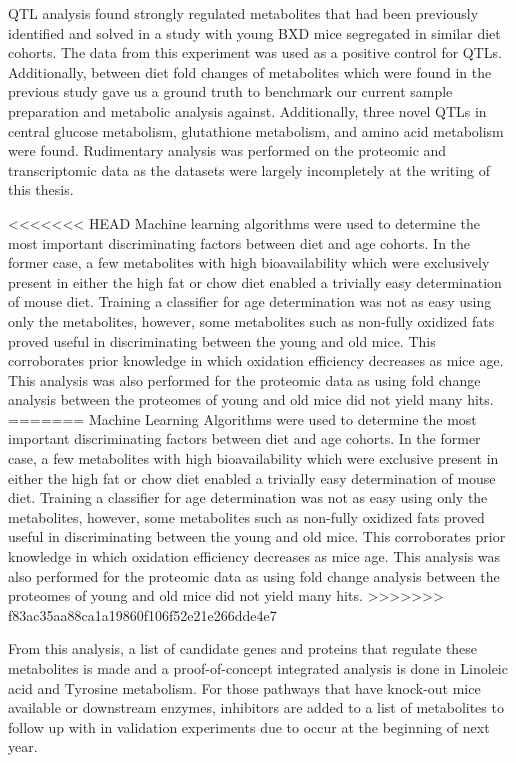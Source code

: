 \documentclass[a4paper,11pt,twoside]{book}
\begin{document}
	QTL analysis found strongly regulated metabolites that had been previously identified and solved in a study with young BXD mice segregated in similar diet cohorts. The data from this experiment was used as a positive control for QTLs. Additionally, between diet fold changes of metabolites which were found in the previous study gave us a ground truth to benchmark our current sample preparation and metabolic analysis against. Additionally, three novel QTLs in central glucose metabolism, glutathione metabolism, and amino acid metabolism were found. Rudimentary analysis was performed on the proteomic and transcriptomic data as the datasets were largely incompletely at the writing of this thesis.

<<<<<<< HEAD
Machine learning algorithms were used to determine the most important discriminating factors between diet and age cohorts. In the former case, a few metabolites with high bioavailability which were exclusively present in either the high fat or chow diet enabled a trivially easy determination of mouse diet. Training a classifier for age determination was not as easy using only the metabolites, however, some metabolites such as non-fully oxidized fats proved useful in discriminating between the young and old mice. This corroborates prior knowledge in which oxidation efficiency decreases as mice age. This analysis was also performed for the proteomic data as using fold change analysis between the proteomes of young and old mice did not yield many hits.
=======
	Machine Learning Algorithms were used to determine the most important discriminating factors between diet and age cohorts. In the former case, a few metabolites with high bioavailability which were exclusive present in either the high fat or chow diet enabled a trivially easy determination of mouse diet. Training a classifier for age determination was not as easy using only the metabolites, however, some metabolites such as non-fully oxidized fats proved useful in discriminating between the young and old mice. This corroborates prior knowledge in which oxidation efficiency decreases as mice age. This analysis was also performed for the proteomic data as using fold change analysis between the proteomes of young and old mice did not yield many hits.
>>>>>>> f83ac35aa88ca1a19860f106f52e21e266dde4e7

	From this analysis, a list of candidate genes and proteins that regulate these metabolites is made and a proof-of-concept integrated analysis is done in Linoleic acid and Tyrosine metabolism. For those pathways that have knock-out mice available or downstream enzymes, inhibitors are added to a list of metabolites to follow up with in validation experiments due to occur at the beginning of next year.
	
\end{document}

